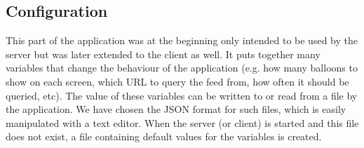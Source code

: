 \subsection{Configuration}

This part of the application was at the beginning only intended to be used by 
the server but was later extended to the client as well. It puts together many 
variables that change the behaviour of the application (e.g. how many balloons 
to show on each screen, which URL to query the feed from, how often it  
should be queried, etc). The value of these variables can be written to or read 
from a file by the application. We have chosen the JSON format for such files, 
which is easily manipulated with a text editor. When the server (or client) is 
started and this file does not exist, a file containing default values for the 
variables is created.

